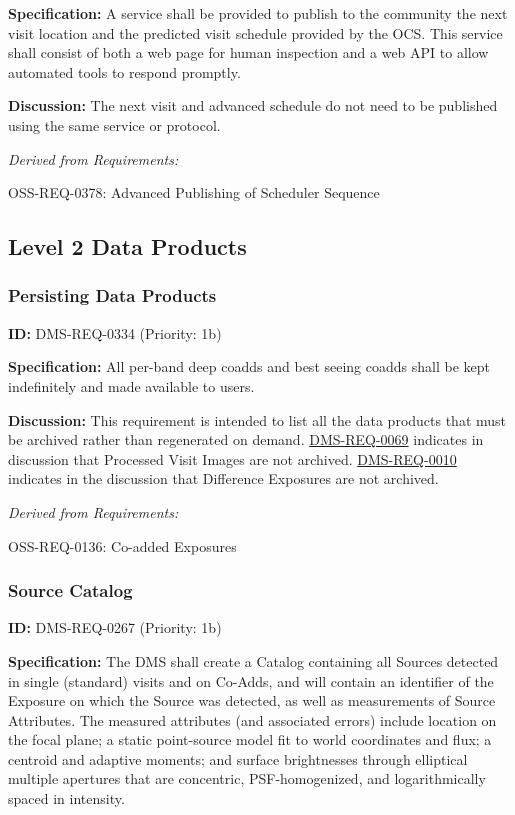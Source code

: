 \documentclass[SE,toc,lsstdraft]{lsstdoc}
\begin{document}
\textbf{Specification:}
A service shall be provided to publish to the community the next visit location and the predicted visit schedule provided by the OCS. This service shall consist of both a web page for human inspection and a web API to allow automated tools to respond promptly.

\textbf{Discussion:}
The next visit and advanced schedule do not need to be published using the same service or protocol.

\emph{Derived from Requirements:}

OSS-REQ-0378:
Advanced Publishing of Scheduler Sequence \newline

\subsection{Level 2 Data Products}

\subsubsection{Persisting Data Products}

\label{DMS-REQ-0334}
\textbf{ID:} DMS-REQ-0334 (Priority: 1b)

\textbf{Specification:}
All per-band deep coadds and best seeing coadds shall be kept indefinitely and made available to users.

\textbf{Discussion:} This requirement is intended to list all the data products that must be archived rather than regenerated on demand. \hyperref[DMS-REQ-0069]{DMS-REQ-0069} indicates in discussion that Processed Visit Images are not archived. \hyperref[DMS-REQ-0010]{DMS-REQ-0010} indicates in the discussion that Difference Exposures are not archived.

\emph{Derived from Requirements:}

OSS-REQ-0136:
Co-added Exposures \newline

\subsubsection{Source Catalog}

\label{DMS-REQ-0267}
\textbf{ID:} DMS-REQ-0267 (Priority: 1b)

\textbf{Specification:} The DMS shall create a Catalog containing all Sources detected in single (standard) visits and on Co-Adds, and will contain an identifier of the Exposure on which the Source was detected, as well as measurements of Source Attributes. The measured attributes (and associated errors) include location on the focal plane; a static point-source model fit to world coordinates and flux; a centroid and adaptive moments; and surface brightnesses through elliptical multiple apertures that are concentric, PSF-homogenized, and logarithmically spaced in intensity.
\end{document}
